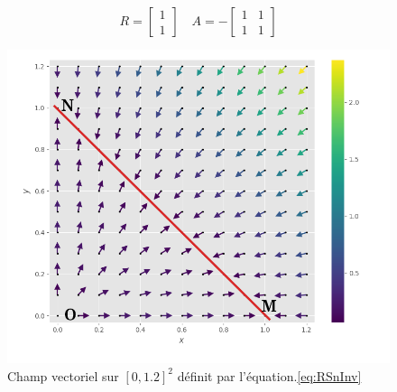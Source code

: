 \documentclass{wsdcr}
\begin{document}
\begin{equation}
R={\begin{bmatrix}1\\1\end{bmatrix}}\quad A =-{\begin{bmatrix}1&1\\1&1\end{bmatrix}}
\label{eq:RSnInv}
\end{equation}
\begin{figure}
    \centering
    \includegraphics[width=\linewidth]{fig/lv2_vf.png}
    \caption{Champ vectoriel sur $[0,1.2]^2$ définit par l'équation.\ref{eq:RSnInv}}
    \label{fig:vf2}
\end{figure}
\end{document}
